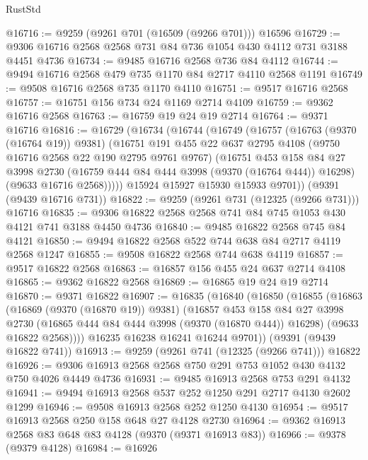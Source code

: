 \begin{lexlean}{RustStd}
\begin{coremodule}
@16716 := @9259 (@9261 @701 (@16509 (@9266 @701))) @16596
@16729 := @9306 @16716 @2568 @2568 @731 @84 @736 @1054 @430 @4112 @731 @3188 @4451 @4736
@16734 := @9485 @16716 @2568 @736 @84 @4112
@16744 := @9494 @16716 @2568 @479 @735 @1170 @84 @2717 @4110 @2568 @1191
@16749 := @9508 @16716 @2568 @735 @1170 @4110
@16751 := @9517 @16716 @2568
@16757 := @16751 @156 @734 @24 @1169 @2714 @4109
@16759 := @9362 @16716 @2568
@16763 := @16759 @19 @24 @19 @2714
@16764 := @9371 @16716
@16816 := @16729
    (@16734
      (@16744
        (@16749
          (@16757
            (@16763 (@9370 (@16764 @19)) @9381)
            (@16751
              @191
              @455
              @22
              @637
              @2795
              @4108
              (@9750 @16716 @2568 @22 @190 @2795 @9761 @9767)
              (@16751
                @453
                @158
                @84
                @27
                @3998
                @2730
                (@16759 @444 @84 @444 @3998 (@9370 (@16764 @444)) @16298)
                (@9633 @16716 @2568)))))
        @15924
        @15927
        @15930
        @15933
        @9701))
    (@9391 (@9439 @16716 @731))
@16822 := @9259 (@9261 @731 (@12325 (@9266 @731))) @16716
@16835 := @9306 @16822 @2568 @2568 @741 @84 @745 @1053 @430 @4121 @741 @3188 @4450 @4736
@16840 := @9485 @16822 @2568 @745 @84 @4121
@16850 := @9494 @16822 @2568 @522 @744 @638 @84 @2717 @4119 @2568 @1247
@16855 := @9508 @16822 @2568 @744 @638 @4119
@16857 := @9517 @16822 @2568
@16863 := @16857 @156 @455 @24 @637 @2714 @4108
@16865 := @9362 @16822 @2568
@16869 := @16865 @19 @24 @19 @2714
@16870 := @9371 @16822
@16907 := @16835
    (@16840
      (@16850
        (@16855
          (@16863
            (@16869 (@9370 (@16870 @19)) @9381)
            (@16857
              @453
              @158
              @84
              @27
              @3998
              @2730
              (@16865 @444 @84 @444 @3998 (@9370 (@16870 @444)) @16298)
              (@9633 @16822 @2568))))
        @16235
        @16238
        @16241
        @16244
        @9701))
    (@9391 (@9439 @16822 @741))
@16913 := @9259 (@9261 @741 (@12325 (@9266 @741))) @16822
@16926 := @9306 @16913 @2568 @2568 @750 @291 @753 @1052 @430 @4132 @750 @4026 @4449 @4736
@16931 := @9485 @16913 @2568 @753 @291 @4132
@16941 := @9494 @16913 @2568 @537 @252 @1250 @291 @2717 @4130 @2602 @1299
@16946 := @9508 @16913 @2568 @252 @1250 @4130
@16954 := @9517 @16913 @2568 @250 @158 @648 @27 @4128 @2730
@16964 := @9362 @16913 @2568 @83 @648 @83 @4128 (@9370 (@9371 @16913 @83))
@16966 := @9378 (@9379 @4128)
@16984 := @16926

\end{coremodule}
\end{lexlean}
